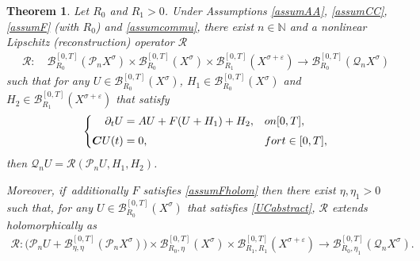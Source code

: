 \documentclass[11pt]{article}
\newtheorem{theorem}{Theorem}[section]
\theoremstyle{definition}
\let\mc\mathcal
\let\veps\varepsilon
\newcommand{\B}{\mc{B}}
\newcommand{\N}{\mathbb{N}}
\newcommand{\Q}{\mathcal{Q}}
\renewcommand{\P}{\mathcal{P}}
\newcommand{\bC}{\boldsymbol{C}}
\begin{document}
\begin{theorem}
\label{thmabstract}Let $R_{0}$ and $R_{1}>0$. Under Assumptions \ref{assumAA}, \ref{assumCC}, \ref{assumF} (with $R_{0}$) and \ref{assumcommu}, there exist $n\in \N$ and a nonlinear Lipschitz (reconstruction) operator $\mathcal{R}$
\begin{align}
\label{Rspace}
\mathcal{R}: \quad \B_{R_{0}}^{[0,T]}(\P_n X^{\sigma}) \times \B_{R_{0}}^{[0,T]}(X^{\sigma}) \times \B_{R_{1}}^{[0,T]}(X^{\sigma+\veps}) \to \B_{R_{0}}^{[0,T]}(\Q_n X^{\sigma})
\end{align}
such that for any $U\in \B_{R_{0}}^{[0,T]}(X^{\sigma})$, $H_{1}\in \B_{R_{0}}^{[0,T]}(X^{\sigma})$ and $H_{2}\in \B_{R_{1}}^{[0,T]}(X^{\sigma+\veps})$ that satisfy
\begin{align}\label{UCabstract}
\left\{\begin{aligned}
\partial_t U&=AU+F(U+H_{1})+H_{2}, &&\textnormal{ on } [0,T], \\[3pt]
\bC U(t)&=0, &&\textnormal{ for }t\in [0,T],
\end{aligned}\right.
\end{align}
then $\Q_n U=\mathcal{R}(\P_{n}U,H_{1},H_{2})$.

Moreover, if~additionally $F$ satisfies \cref{assumFholom} then there exist $\eta,\eta_1>0$ such that, for any $U\in \B_{R_{0}}^{[0,T]}(X^{\sigma})$ that satisfies \eqref{UCabstract}, $\mathcal{R}$ extends holomorphically as
\begin{align*}
\mathcal{R}: \bigl( \P_nU+ \B_{\eta,\eta}^{[0,T]}(\P_n X^{\sigma})\bigr) \times \B_{R_{0},\eta}^{[0,T]}(X^{\sigma}) \times \B_{R_{1},R_{1}}^{[0,T]}(X^{\sigma+\veps}) \to \B_{R_{0},\eta_1}^{[0,T]}(\Q_n X^{\sigma}).
\end{align*}
\end{theorem}
\end{document}
